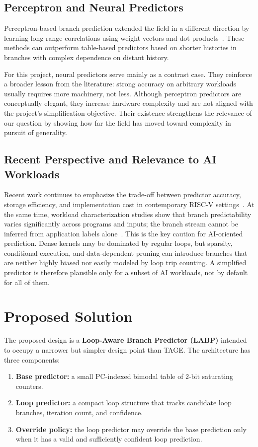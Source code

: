 \documentclass[conference]{IEEEtran}
\begin{document}
\subsection{Perceptron and Neural Predictors}
Perceptron-based branch prediction extended the field in a different direction by learning long-range correlations using weight vectors and dot products~\cite{jimenez_lin_2001,jimenez_lin_2002}. These methods can outperform table-based predictors based on shorter histories in branches with complex dependence on distant history.

For this project, neural predictors serve mainly as a contrast case. They reinforce a broader lesson from the literature: strong accuracy on arbitrary workloads usually requires more machinery, not less. Although perceptron predictors are conceptually elegant, they increase hardware complexity and are not aligned with the project's simplification objective. Their existence strengthens the relevance of our question by showing how far the field has moved toward complexity in pursuit of generality.

\subsection{Recent Perspective and Relevance to AI Workloads}
Recent work continues to emphasize the trade-off between predictor accuracy, storage efficiency, and implementation cost in contemporary RISC-V settings~\cite{sutar_guinde_2025}. At the same time, workload characterization studies show that branch predictability varies significantly across programs and inputs; the branch stream cannot be inferred from application labels alone~\cite{vikas_gratz_jimenez_2025}. This is the key caution for AI-oriented prediction. Dense kernels may be dominated by regular loops, but sparsity, conditional execution, and data-dependent pruning can introduce branches that are neither highly biased nor easily modeled by loop trip counting. A simplified predictor is therefore plausible only for a subset of AI workloads, not by default for all of them.

\section{Proposed Solution}
The proposed design is a \textbf{Loop-Aware Branch Predictor (LABP)} intended to occupy a narrower but simpler design point than TAGE. The architecture has three components:

\begin{enumerate}
    \item \textbf{Base predictor:} a small PC-indexed bimodal table of 2-bit saturating counters.
    \item \textbf{Loop predictor:} a compact loop structure that tracks candidate loop branches, iteration count, and confidence.
    \item \textbf{Override policy:} the loop predictor may override the base prediction only when it has a valid and sufficiently confident loop prediction.
\end{enumerate}
\end{document}
